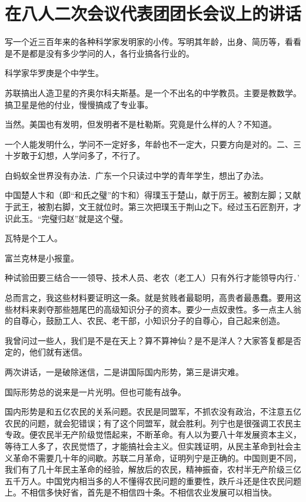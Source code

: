 \section[在八人二次会议代表团团长会议上的讲话（一九五八年五月十八日）]{在八人二次会议代表团团长会议上的讲话}


写一个近三百年来的各种科学家发明家的小传。写明其年龄，出身、简历等，看看是不是都是没有多少学问的人，各行业搞各行业的。

科学家华罗庚是个中学生。

苏联搞出人造卫星的齐奥尔科夫斯基。是一个不出名的中学教员。主要是教数学。搞卫星是他的付业，慢慢搞成了专业事。

当然。美国也有发明，但发明者不是杜勒斯。究竟是什么样的人？不知道。

一个人能发明什么，学问不一定好多，年龄也不一定大，只要方向是对的。二、三十岁敢于幻想，人学问多了，不行了。

白蚂蚁全世界没有办法．广东一个只读过中学的青年学生，想出了办法。

中国楚人卞和（即“和氏之璧”的卞和）得璞玉于楚山，献于厉王。被割左脚；又献于武王，被割右脚，文王就位时。第三次把璞玉于荆山之下。经过玉石匠割开，才识此玉。“完璧归赵”就是这个璧。

瓦特是个工人。

富兰克林是小报童。

种试验田要三结合一一领导、技术人员、老农（老工人）只有外行才能领导内行．’

总而言之，我这些材料要证明这一条。就是贫贱者最聪明，高贵者最愚蠢。要用这些材料来剥夺那些翘尾巴的高级知识分子的资本。要少一点奴隶性。多一点主人翁的自尊心，鼓励工人、农民、老干部，小知识分子的自尊心，自己起来创造。

我曾问过一些人，我们是不是在天上？算不算神仙？是不是洋人？大家答复都是否定的，他们就有迷信。

两次讲话，一是破除迷信，二是讲国际国内形势，第三是讲灾难。

国际形势总的说来是一片光明。但也可能有战争。

国内形势是和五亿农民的关系问题。农民是同盟军，不抓农没有政治，不注意五亿农民的问题，就会犯错误；有了这个同盟军，就会胜利。列宁也是很强调工农民主专政。便农民半无产阶级觉悟起来，不断革命。有人以为要八十年发展资本主义，等待工人多了，农民觉悟了，才能搞社会主义。但实践证明，从民主革命到社会主义革命不需要几十年的间歇。苏联二月革命，证明列宁是正确的。中国则更不同，我们有了几十年民主革命的经验，解放后的农民，精神振奋，农村半无产阶级三亿五千万人。中国党内相当多的人不懂得农民问题的重要性，跌斤斗还是住农民问题上。不相信多快好省，首先是不相信四十条。不相信农业发展可以相当快。

